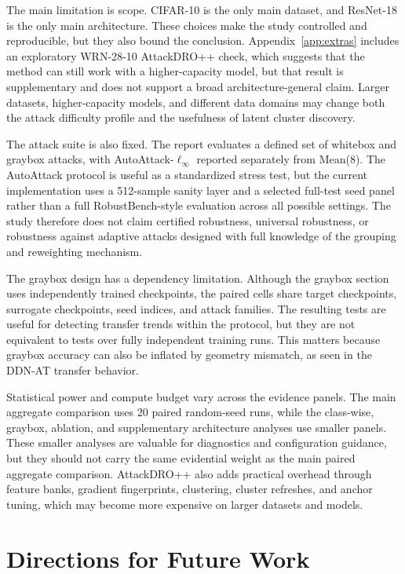 The main limitation is scope.  CIFAR-10 is the only main dataset, and ResNet-18
is the only main architecture.  These choices make the study controlled and
reproducible, but they also bound the conclusion.  Appendix~\ref{app:extras}
includes an exploratory WRN-28-10 AttackDRO++ check, which suggests that the
method can still work with a higher-capacity model, but that result is
supplementary and does not support a broad architecture-general claim.  Larger
datasets, higher-capacity models, and different data domains may change both the
attack difficulty profile and the usefulness of latent cluster discovery.

The attack suite is also fixed.  The report evaluates a defined set of
whitebox and graybox attacks, with AutoAttack-$\ell_\infty$ reported separately
from Mean(8).  The AutoAttack protocol is useful as a standardized stress test,
but the current implementation uses a 512-sample sanity layer and a selected
full-test seed panel rather than a full RobustBench-style evaluation across all
possible settings.  The study therefore does not claim certified robustness,
universal robustness, or robustness against adaptive attacks designed with full
knowledge of the grouping and reweighting mechanism.

The graybox design has a dependency limitation.  Although the graybox section
uses independently trained checkpoints, the paired cells share target
checkpoints, surrogate checkpoints, seed indices, and attack families.  The
resulting tests are useful for detecting transfer trends within the protocol,
but they are not equivalent to tests over fully independent training runs.  This
matters because graybox accuracy can also be inflated by geometry mismatch, as
seen in the DDN-AT transfer behavior.

Statistical power and compute budget vary across the evidence panels.  The main
aggregate comparison uses 20 paired random-seed runs, while the class-wise,
graybox, ablation, and supplementary architecture analyses use smaller panels.
These smaller analyses are valuable for diagnostics and configuration guidance,
but they should not carry the same evidential weight as the main paired
aggregate comparison.  AttackDRO++ also adds practical overhead through feature
banks, gradient fingerprints, clustering, cluster refreshes, and anchor tuning,
which may become more expensive on larger datasets and models.

\section{Directions for Future Work}


